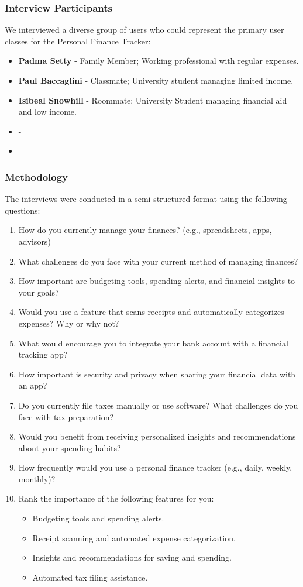 \subsubsection{Interview Participants}
We interviewed a diverse group of users who could represent the primary user classes for the Personal Finance Tracker:

\begin{itemize}
    \item \textbf{Padma Setty} - Family Member; Working professional with regular expenses.
    \item \textbf{Paul Baccaglini} - Classmate; University student managing limited income.
    \item \textbf{Isibeal Snowhill} - Roommate; University Student managing financial aid and low income. 
    \item \textbf{} - 
    \item \textbf{} - 
\end{itemize}

\subsubsection{Methodology}
The interviews were conducted in a semi-structured format using the following questions:

\begin{enumerate}
    \item How do you currently manage your finances? (e.g., spreadsheets, apps, advisors)
    \item What challenges do you face with your current method of managing finances?
    \item How important are budgeting tools, spending alerts, and financial insights to your goals?
    \item Would you use a feature that scans receipts and automatically categorizes expenses? Why or why not?
    \item What would encourage you to integrate your bank account with a financial tracking app?
    \item How important is security and privacy when sharing your financial data with an app?
    \item Do you currently file taxes manually or use software? What challenges do you face with tax preparation?
    \item Would you benefit from receiving personalized insights and recommendations about your spending habits?
    \item How frequently would you use a personal finance tracker (e.g., daily, weekly, monthly)?
    \item Rank the importance of the following features for you: 
    \begin{itemize}
        \item Budgeting tools and spending alerts.
        \item Receipt scanning and automated expense categorization.
        \item Insights and recommendations for saving and spending.
        \item Automated tax filing assistance.
    \end{itemize}
\end{enumerate}

